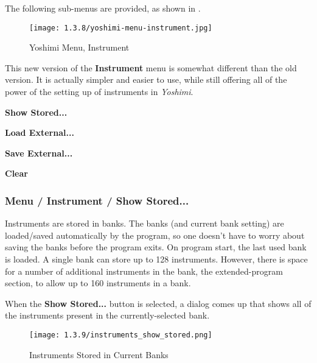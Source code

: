    The following sub-menus are provided, as shown in
   .

\begin{figure}[H]
   \centering 
   \texttt{[image: 1.3.8/yoshimi-menu-instrument.jpg]}
   \caption{Yoshimi Menu, Instrument}
   \label{fig:yoshimi_instrument_menu}
\end{figure}

   This new version of the \textbf{Instrument} menu is somewhat different than
   the old version.  It is actually simpler and easier to use, while still
   offering all of the power of the setting up of instruments in
   \textsl{Yoshimi}.

   \begin{enumber}
      \item \textbf{Show Stored...}
      \item \textbf{Load External...}
      \item \textbf{Save External...}
      \item \textbf{Clear}
   \end{enumber}


\subsubsection{Menu / Instrument / Show Stored...}
\label{subsubsec:menu_instrument_show}

   Instruments are stored in banks. The banks (and current bank setting) are
   loaded/saved automatically by the program, so one doesn't have to worry
   about saving the banks before the program exits. On program start, the last
   used bank is loaded. A single bank can store up to 128 instruments.
   However, there is space for a number of additional instruments in the bank,
   the extended-program section, to allow up to 160 instruments in a bank.

   When the \textbf{Show Stored...} button is selected, a dialog comes
   up that shows all of the instruments present in the currently-selected
   bank.
   
\begin{figure}[H]
   \centering 
   \texttt{[image: 1.3.9/instruments\_show\_stored.png]}
   \caption[Show Stored Instruments]{Instruments Stored in Current Banks}
   \label{fig:instruments_show_stored}
\end{figure}

